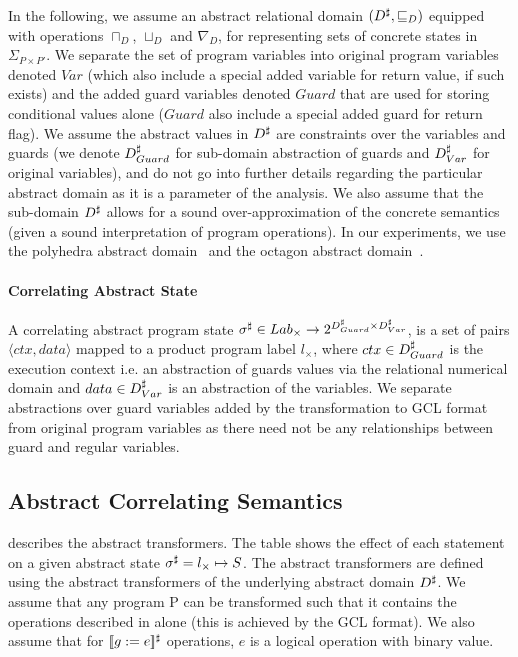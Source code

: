 In the following, we assume an abstract relational domain $(D^\sharp, \sqsubseteq_{D})$ equipped with operations $\sqcap_{D}$, $\sqcup_{D}$ and $\nabla_{D}$, for representing sets of concrete states in $\Sigma_{P \times P'}$. We separate the set of program variables into original program variables denoted $Var$ (which also include a special added variable for return value, if such exists) and the added guard variables denoted $Guard$ that are used for storing conditional values alone ($Guard$ also include a special added guard for return flag). We assume the abstract values in $D^\sharp$ are constraints over the variables and guards (we denote $D^\sharp_{Guard}$ for sub-domain abstraction of guards and $D^\sharp_{Var}$ for original variables), and do not go into further details regarding the particular abstract domain as it is a parameter of the analysis. We also assume that the sub-domain $D^\sharp$ allows for a sound over-approximation of the concrete semantics (given a sound interpretation of program operations). In our experiments, we use the polyhedra abstract domain~\cite{CousotHalbwachs78} and the octagon abstract domain~\cite{Mine2006}.

\paragraph{Correlating Abstract State} 
A correlating abstract program state $\sigma^\sharp \in Lab_{\times} \rightarrow 2^{D^\sharp_{Guard} \times D^\sharp_{Var}}$, is a set of pairs $\langle ctx, data \rangle$ mapped to a product program label $l_{\times}$, where $ctx \in D^\sharp_{Guard}$ is the execution context i.e. an abstraction of guards values via the relational numerical domain and $data \in D^\sharp_{Var}$ is an abstraction of the variables. We separate abstractions over guard variables added by the transformation to GCL format from original program variables as there need not be any relationships between guard and regular variables.

\subsection{Abstract Correlating Semantics}



 describes the abstract transformers. The table shows the effect of each statement on a given abstract state $\sigma^\sharp = l_{\times} \mapsto S$. The abstract transformers are defined using the abstract transformers of the underlying abstract domain $D^\sharp$. We assume that any program P can be transformed such that it contains the operations described in  alone (this is achieved by the GCL format). We also assume that for $\lbrack\!\lbrack g:=e \rbrack\!\rbrack^{\sharp}$ operations, $e$ is a logical operation with binary value.

